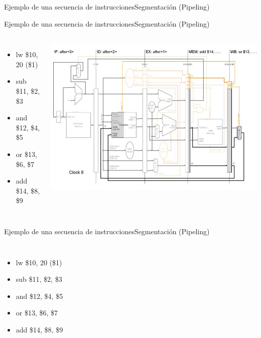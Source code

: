 \documentclass[aspectratio=169,compress]{beamer}
\begin{document}
\begin{footnotesize}
\begin{frame}{Ejemplo de una secuencia de instrucciones}{Segmentación (Pipeling)}
\end{frame}

\begin{frame}{Ejemplo de una secuencia de instrucciones}{Segmentación (Pipeling)}

 \begin{columns}[onlytextwidth,T]
      \column{\dimexpr\linewidth-110mm-5mm}

\bigskip
\begin{itemize}
\item lw \$10, 20 (\$1)
\item sub \$11, \$2, \$3
\item and \$12, \$4, \$5
\item or \$13, \$6, \$7
\item add \$14, \$8, \$9
\end{itemize}

      \column{100mm}
\includegraphics[scale=0.35]{images/pipeling8.jpg} 
    \end{columns}

\end{frame}

\begin{frame}{Ejemplo de una secuencia de instrucciones}{Segmentación (Pipeling)}

 \begin{columns}[onlytextwidth,T]
      \column{\dimexpr\linewidth-110mm-5mm}

\bigskip
\begin{itemize}
\item lw \$10, 20 (\$1)
\item sub \$11, \$2, \$3
\item and \$12, \$4, \$5
\item or \$13, \$6, \$7
\item add \$14, \$8, \$9
\end{itemize}


\end{columns}
\end{frame}
\end{footnotesize}
\end{document}
